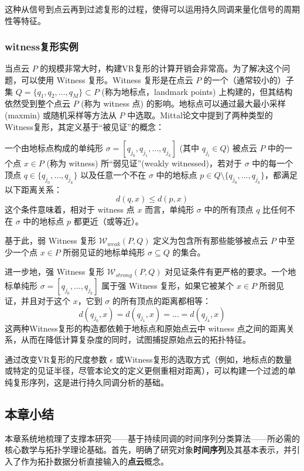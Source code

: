 这种从信号到点云再到过滤复形的过程，使得可以运用持久同调来量化信号的周期性等特征。


\subsubsection{witness复形实例}
当点云 $P$ 的规模非常大时，构建VR复形的计算开销会非常高。为了解决这个问题，可以使用 Witness 复形\cite{de2004topological}。Witness 复形是在点云 $P$ 的一个（通常较小的）子集 $Q = \{q_1, q_2, \ldots, q_M\} \subset P$ (称为地标点，landmark points) 上构建的，但其结构依然受到整个点云 $P$ (称为 witness 点) 的影响。地标点可以通过最大最小采样 (maxmin) 或随机采样等方法从 $P$ 中选取。Mittal\cite{mittal2017topological}论文中提到了两种类型的Witness复形，其定义基于“被见证”的概念：

一个由地标点构成的单纯形 $\sigma = [q_{j_0}, q_{j_1}, \ldots, q_{j_k}]$ (其中 $q_{j_l} \in Q$) 被点云 $P$ 中的一个点 $x \in P$ (称为 witness) 所“弱见证”(weakly witnessed)，若对于 $\sigma$ 中的每一个顶点 $q \in \{q_{j_0}, \ldots, q_{j_k}\}$ 以及任意一个不在 $\sigma$ 中的地标点 $p \in Q \setminus \{q_{j_0}, \ldots, q_{j_k}\}$，都满足以下距离关系：
\begin{equation}
    d(q, x) \le d(p, x)
\end{equation}
这个条件意味着，相对于 witness 点 $x$ 而言，单纯形 $\sigma$ 中的所有顶点 $q$ 比任何不在 $\sigma$ 中的地标点 $p$ 都更近（或等近）。

基于此，弱 Witness 复形 $\mathcal{W}_{weak}(P, Q)$ 定义为包含所有那些能够被点云 $P$ 中至少一个点 $x \in P$ 所弱见证的地标单纯形 $\sigma \subseteq Q$ 的集合。

进一步地，强 Witness 复形 $\mathcal{W}_{strong}(P, Q)$ 对见证条件有更严格的要求。一个地标单纯形 $\sigma = [q_{j_0}, \ldots, q_{j_k}]$ 属于强 Witness 复形，如果它被某个 $x \in P$ 所弱见证，并且对于这个 $x$，它到 $\sigma$ 的所有顶点的距离都相等：
\begin{equation}
    d(q_{j_0}, x) = d(q_{j_1}, x) = \ldots = d(q_{j_k}, x)
\end{equation}
这两种Witness复形的构造都依赖于地标点和原始点云中 witness 点之间的距离关系，从而在降低计算复杂度的同时，试图捕捉原始点云的拓扑特征\cite{1023810871.nh}。

通过改变VR复形的尺度参数 $\epsilon$ 或Witness复形的选取方式（例如，地标点的数量或特定的见证半径，尽管本论文的定义更侧重相对距离），可以构建一个过滤的单纯复形序列，这是进行持久同调分析的基础。
\subsection{本章小结}
本章系统地梳理了支撑本研究——基于持续同调的时间序列分类算法——所必需的核心数学与拓扑学理论基础。首先，明确了研究对象\textbf{时间序列}及其基本表示，并引入了作为拓扑数据分析直接输入的\textbf{点云}概念。


